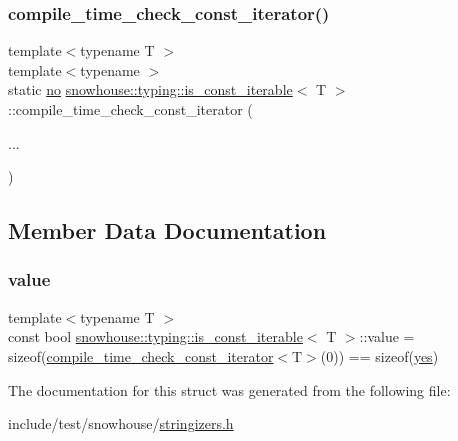\subsubsection{\texorpdfstring{compile\_time\_check\_const\_iterator()}{compile\_time\_check\_const\_iterator()}\hspace{0.1cm}{\footnotesize\ttfamily [2/2]}}
{\footnotesize\ttfamily template$<$typename T $>$ \\
template$<$typename $>$ \\
static \mbox{\hyperlink{namespacesnowhouse_1_1typing_ad9bd8c4cca2c9f7de1faf7a7f53b1bda}{no}} \mbox{\hyperlink{structsnowhouse_1_1typing_1_1is__const__iterable}{snowhouse\+::typing\+::is\+\_\+const\+\_\+iterable}}$<$ T $>$\+::compile\+\_\+time\+\_\+check\+\_\+const\+\_\+iterator (\begin{DoxyParamCaption}\item[{}]{... }\end{DoxyParamCaption})\hspace{0.3cm}{\ttfamily [static]}}



\subsection{Member Data Documentation}
\mbox{\label{structsnowhouse_1_1typing_1_1is__const__iterable_ab68b85b809b6417989816d6b4605c6e6}} 
\subsubsection{\texorpdfstring{value}{value}}
{\footnotesize\ttfamily template$<$typename T $>$ \\
const bool \mbox{\hyperlink{structsnowhouse_1_1typing_1_1is__const__iterable}{snowhouse\+::typing\+::is\+\_\+const\+\_\+iterable}}$<$ T $>$\+::value = sizeof(\mbox{\hyperlink{structsnowhouse_1_1typing_1_1is__const__iterable_a08ed1d0c1623931531b729c3a3d863af}{compile\+\_\+time\+\_\+check\+\_\+const\+\_\+iterator}}$<$T$>$(0)) == sizeof(\mbox{\hyperlink{namespacesnowhouse_1_1typing_a4b319cb7567ee3475023c05ed2dadb16}{yes}})\hspace{0.3cm}{\ttfamily [static]}}



The documentation for this struct was generated from the following file\+:\begin{DoxyCompactItemize}
\item 
include/test/snowhouse/\mbox{\hyperlink{stringizers_8h}{stringizers.\+h}}\end{DoxyCompactItemize}
